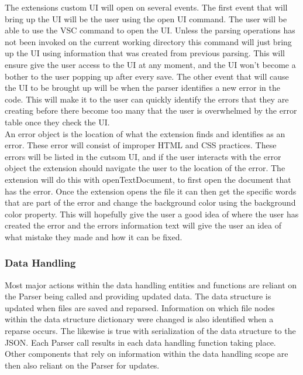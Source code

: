 \documentclass[letterpaper,10pt,titlepage,draftclsnofoot,onecolumn,onesided] {IEEEtran}
\begin{document}
	The extensions custom UI will open on several events. 
	The first event that will bring up the UI will be the user using the open UI command. 
	The user will be able to use the VSC command to open the UI. 
	Unless the parsing operations has not been invoked on the current working directory this command will just bring up the UI using information that was created from previous parsing. 
	This will ensure give the user access to the UI at any moment, and the UI won't become a bother to the user popping up after every save. 
	The other event that will cause the UI to be brought up will be when the parser identifies a new error in the code.	
	This will make it to the user can quickly identify the errors that they are creating before there become too many that the user is overwhelmed by the error table once they check the UI. \\

	An error object is the location of what the extension finds and identifies as an error.
	These error will consist of improper HTML and CSS practices. 
	These errors will be listed in the cutsom UI, and if the user interacts with the error object the extension should navigate the user to the location of the error.
	The extension will do this with openTextDocument, to first open the document that has the error. 
	Once the extension opens the file it can then get the specific words that are part of the error and change the background color using the background color property. \cite{VSCodeDocumentation}
	This will hopefully give the user a good idea of where the user has created the error and the errors information text will give the user an idea of what mistake they made and how it can be fixed.

\subsubsection{Data Handling}
	Most major actions within the data handling entities and functions are reliant on the Parser being called and providing updated data.
	The data structure is updated when files are saved and reparsed. 
	Information on which file nodes within the data structure dictionary were changed is also identified when a reparse occurs.
	The likewise is true with serialization of the data structure to the JSON.
	Each Parser call results in each data handling function taking place. 
	Other components that rely on information within the data handling scope are then also reliant on the Parser for updates.
	
\end{document}
